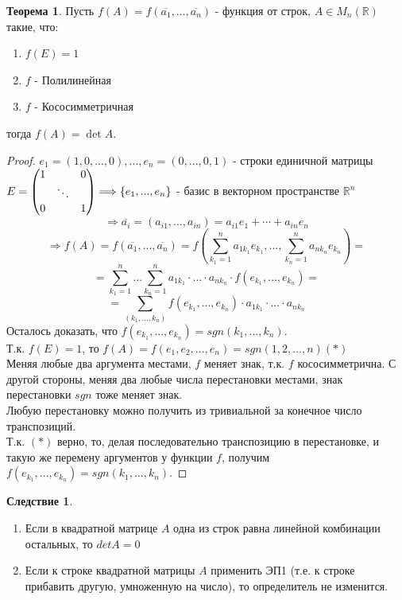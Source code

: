\documentclass[a4paper, 12pt]{article}
\newcommand{\R}{\mathbb R}
\newcommand\tab[1][.5cm]{\hspace*{#1}}
\newcounter{thcount}
\theoremstyle{definition}
\newtheorem*{consequense}{Следствие}
\newtheorem{theoremnum}[thcount]{Теорема}
\begin{document}
  \begin{theoremnum}
    Пусть $f(A)=f(\overline{a_1},\dots,\overline{a_n})$ - функция от строк, $A\in M_n(\R)$ такие, что:
    \begin{enumerate}
      \item $f(E)=1$
      \item $f$ - Полилинейная
      \item $f$ - Кососимметричная
    \end{enumerate}
      тогда $f(A)=\det{A}$.
  \end{theoremnum}
  \begin{proof}
    $e_1 = (1,0,...,0),...,e_n=(0,...,0,1)$ - строки единичной матрицы $E = \begin{pmatrix}
      1 & \null & 0\\
      \null & \ddots & \null \\
      0 & \null & 1
    \end{pmatrix} \Longrightarrow  \{e_1,...,e_n\}$ - базис в векторном пространстве $\R^n$ 
    $$\Longrightarrow \overline{a_i} = (a_{i1},...,a_{in}) = a_{i1}e_1 + \cdots + a_{in}e_n$$
    $$\Longrightarrow f(A) = f(\overline{a_1},...,\overline{a_n}) = f(\sum \limits_{k_1=1}^na_{1k_1}e_{k_1}, ..., \sum \limits_{k_n=1}^na_{nk_n}e_{k_n}) = $$
    $$= \sum \limits_{k_1=1}^n ... \sum \limits_{k_n=1}^n a_{1k_1}\cdot ... \cdot a_{nk_n}\cdot f(e_{k_1},...,e_{k_n}) =$$
    $$= \sum \limits_{(k_1,...,k_n)}f(e_{k_1},...,e_{k_n})\cdot a_{1k_1}\cdot ... \cdot a_{nk_n}$$ 
    Осталось доказать, что $f(e_{k_1},...,e_{k_n}) = sgn(k_1,...,k_n)$. \\
    Т.к. $f(E) =1$, то $f(A) = f(e_1,e_2,...,e_n) = sgn(1,2,...,n) (*)$   \\
    Меняя любые два аргумента местами, $f$ меняет знак, т.к. $f$ кососимметрична. С другой стороны, меняя два любые числа перестановки местами, знак перестановки $sgn$ тоже меняет знак. \\
    Любую перестановку можно получить из тривиальной за конечное число транспозиций. \\
    Т.к. $(*)$ верно, то, делая последовательно транспозицию в перестановке, и такую же перемену аргументов у функции $f$, получим $f(e_{k_1},...,e_{k_n}) = sgn(k_1,...,k_n)$. 
  \end{proof} 
  \begin{consequense} \tab
    \begin{enumerate}
      \item Если в квадратной матрице $A$ одна из строк равна линейной комбинации остальных, то $detA = 0$
      \item Если к строке квадратной матрицы $A$ применить ЭП1 (т.е. к строке прибавить другую, умноженную на число), то определитель не изменится. 
    \end{enumerate}
  \end{consequense} 
\end{document}
